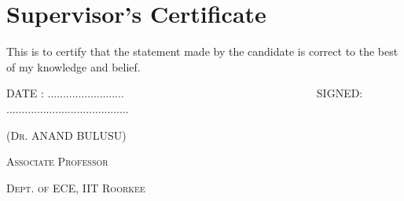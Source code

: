 %
%
%
%
%
%
\chapter*{Supervisor's Certificate}
\begin{OnehalfSpacing}
This is to certify that the statement made by the candidate is correct to the best of my knowledge and belief.

\vspace{2.25cm}
\noindent
\textsc{DATE : .........................~~~~~~~~~~~~~~~~~~~~~~~~~~~~~~~~~~~SIGNED: ........................................}

\nobreak
\hfill \textsc{(Dr. ANAND BULUSU)}

\vspace{-4 mm}
\nobreak
\hfill \textsc{Associate Professor}

\vspace{-4 mm}
\nobreak
\hfill \textsc{Dept. of ECE, IIT Roorkee}
\end{OnehalfSpacing}
\clearpage 